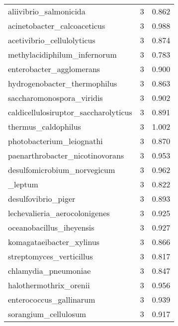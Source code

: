 \begin{tabular}{lrr}
                      aliivibrio\_salmonicida &                   3 &     0.862 \\
                 acinetobacter\_calcoaceticus &                   3 &     0.988 \\
                  acetivibrio\_cellulolyticus &                   3 &     0.874 \\
                methylacidiphilum\_infernorum &                   3 &     0.783 \\
                    enterobacter\_agglomerans &                   3 &     0.900 \\
                hydrogenobacter\_thermophilus &                   3 &     0.863 \\
                   saccharomonospora\_viridis &                   3 &     0.902 \\
        caldicellulosiruptor\_saccharolyticus &                   3 &     0.891 \\
                         thermus\_caldophilus &                   3 &     1.002 \\
                   photobacterium\_leiognathi &                   3 &     0.870 \\
             paenarthrobacter\_nicotinovorans &                   3 &     0.953 \\
                 desulfomicrobium\_norvegicum &                   3 &     0.962 \\
                        [clostridium]\_leptum &                   3 &     0.822 \\
                         desulfovibrio\_piger &                   3 &     0.893 \\
               lechevalieria\_aerocolonigenes &                   3 &     0.925 \\
                    oceanobacillus\_iheyensis &                   3 &     0.927 \\
                    komagataeibacter\_xylinus &                   3 &     0.866 \\
                    streptomyces\_verticillus &                   3 &     0.817 \\
                        chlamydia\_pneumoniae &                   3 &     0.847 \\
                      halothermothrix\_orenii &                   3 &     0.956 \\
                     enterococcus\_gallinarum &                   3 &     0.939 \\
                        sorangium\_cellulosum &                   3 &     0.917 \\

\end{tabular}

